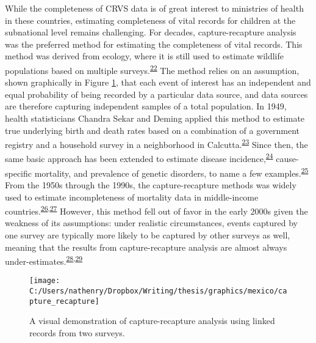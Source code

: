 \documentclass[
]{article}
\begin{document}
While the completeness of CRVS data is of great interest to ministries of health in these countries, estimating completeness of vital records for children at the subnational level remains challenging. For decades, capture-recapture analysis was the preferred method for estimating the completeness of vital records. This method was derived from ecology, where it is still used to estimate wildlife populations based on multiple surveys.\textsuperscript{\protect\hyperlink{ref-Smith1988}{22}} The method relies on an assumption, shown graphically in Figure \ref{fig:capture-recapture}, that each event of interest has an independent and equal probability of being recorded by a particular data source, and data sources are therefore capturing independent samples of a total population. In 1949, health statisticians Chandra Sekar and Deming applied this method to estimate true underlying birth and death rates based on a combination of a government registry and a household survey in a neighborhood in Calcutta.\textsuperscript{\protect\hyperlink{ref-ChandraSekar1949}{23}} Since then, the same basic approach has been extended to estimate disease incidence,\textsuperscript{\protect\hyperlink{ref-Tilling2001a}{24}} cause-specific mortality, and prevalence of genetic disorders, to name a few examples.\textsuperscript{\protect\hyperlink{ref-Hook1995}{25}} From the 1950s through the 1990s, the capture-recapture methods was widely used to estimate incompleteness of mortality data in middle-income countries.\textsuperscript{\protect\hyperlink{ref-Yip1995}{26},\protect\hyperlink{ref-Becker1996}{27}} However, this method fell out of favor in the early 2000s given the weakness of its assumptions: under realistic circumstances, events captured by one survey are typically more likely to be captured by other surveys as well, meaning that the results from capture-recapture analysis are almost always under-estimates.\textsuperscript{\protect\hyperlink{ref-Tilling2001}{28},\protect\hyperlink{ref-Cormack1999}{29}}

\begin{figure}[!ht]

{\centering \texttt{[image: C:/Users/nathenry/Dropbox/Writing/thesis/graphics/mexico/capture\_recapture]} 

}

\caption{A visual demonstration of capture-recapture analysis using linked records from two surveys.}\label{fig:capture-recapture}
\end{figure}
\end{document}
